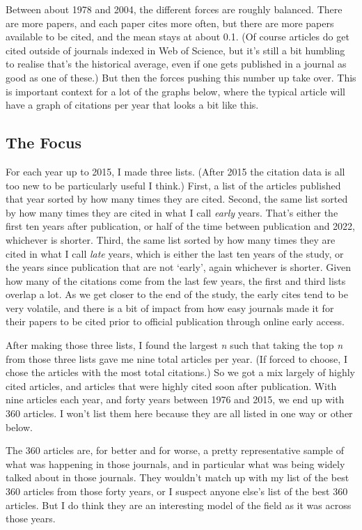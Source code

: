 \documentclass[
  10pt,
  letterpaper,
  DIV=11,
  numbers=noendperiod,
  twoside]{scrartcl}
\begin{document}
Between about 1978 and 2004, the different forces are roughly balanced.
There are more papers, and each paper cites more often, but there are
more papers available to be cited, and the mean stays at about 0.1. (Of
course articles do get cited outside of journals indexed in Web of
Science, but it's still a bit humbling to realise that's the historical
average, even if one gets published in a journal as good as one of
these.) But then the forces pushing this number up take over. This is
important context for a lot of the graphs below, where the typical
article will have a graph of citations per year that looks a bit like
this.

\subsection{The Focus}\label{sec-focus}

For each year up to 2015, I made three lists. (After 2015 the citation
data is all too new to be particularly useful I think.) First, a list of
the articles published that year sorted by how many times they are
cited. Second, the same list sorted by how many times they are cited in
what I call \emph{early} years. That's either the first ten years after
publication, or half of the time between publication and 2022, whichever
is shorter. Third, the same list sorted by how many times they are cited
in what I call \emph{late} years, which is either the last ten years of
the study, or the years since publication that are not `early', again
whichever is shorter. Given how many of the citations come from the last
few years, the first and third lists overlap a lot. As we get closer to
the end of the study, the early cites tend to be very volatile, and
there is a bit of impact from how easy journals made it for their papers
to be cited prior to official publication through online early access.

After making those three lists, I found the largest \emph{n} such that
taking the top \emph{n} from those three lists gave me nine total
articles per year. (If forced to choose, I chose the articles with the
most total citations.) So we got a mix largely of highly cited articles,
and articles that were highly cited soon after publication. With nine
articles each year, and forty years between 1976 and 2015, we end up
with 360 articles. I won't list them here because they are all listed in
one way or other below.

The 360 articles are, for better and for worse, a pretty representative
sample of what was happening in those journals, and in particular what
was being widely talked about in those journals. They wouldn't match up
with my list of the best 360 articles from those forty years, or I
suspect anyone else's list of the best 360 articles. But I do think they
are an interesting model of the field as it was across those years.
\end{document}
